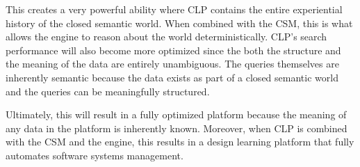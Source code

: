 This creates a very powerful ability where CLP contains the entire experiential history of the closed semantic world. When combined with the CSM, this is what allows the engine to reason about the world deterministically. CLP's search performance will also become more optimized since the both the structure and the meaning of the data are entirely unambiguous. The queries themselves are inherently semantic because the data exists as part of a closed semantic world and the queries can be meaningfully structured. 

Ultimately, this will result in a fully optimized platform because the meaning of any data in the platform is inherently known. Moreover, when CLP is combined with the CSM and the engine, this results in a design learning platform that fully automates software systems management.

